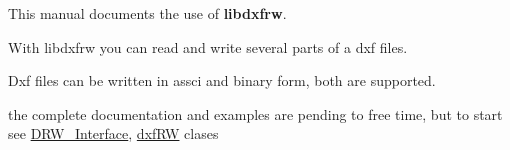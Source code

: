This manual documents the use of {\bfseries{libdxfrw}}.

With libdxfrw you can read and write several parts of a dxf files.

Dxf files can be written in assci and binary form, both are supported.

the complete documentation and examples are pending to free time, but to start see \mbox{\hyperlink{classDRW__Interface}{DRW\+\_\+\+Interface}}, \mbox{\hyperlink{classdxfRW}{dxf\+RW}} clases 
